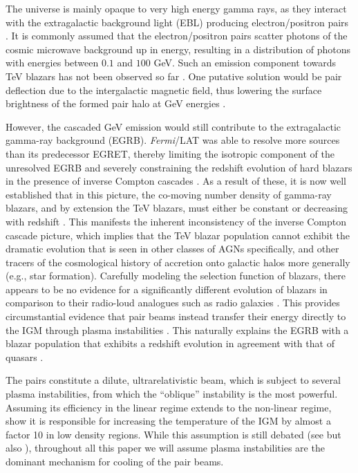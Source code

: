 \documentclass[numberedappendix]{emulateapj}
\begin{document}
The universe is mainly opaque to very high energy gamma rays, as they interact with the extragalactic background light (EBL) producing electron/positron pairs \citep{1967PhRv..155.1408G,1992ApJ...390L..49S}. It is commonly assumed that the electron/positron pairs scatter photons of the cosmic microwave background up in energy, resulting in a distribution of photons with energies between $0.1$ and $100$ GeV. Such an emission component towards TeV blazars has not been observed so far \citep{2010A&A...524A..77A,2014A&A...562A.145H}. One putative solution would be pair deflection due to the intergalactic magnetic field, thus lowering the surface brightness of the formed pair halo at GeV energies \citep{2013A&ARv..21...62D,2012ApJ...747L..14V,2011ApJ...733L..21D}. 

However, the cascaded GeV emission would still contribute to the extragalactic gamma-ray background (EGRB). \textit{Fermi}/LAT was able to resolve more sources than its predecessor EGRET, thereby limiting the isotropic component of the unresolved EGRB and severely constraining the redshift evolution of hard blazars in the presence of inverse Compton cascades \citep[e.g.,][]{Vent:10,Murase:2012,Inoue:2012}. As a result of these, it is now well established that in this picture, the co-moving number density of gamma-ray blazars, and by extension the TeV blazars, must either be constant or decreasing with redshift \citep{Knei-Mann:08,Vent:10,Abazajian:2011,Inoue:2012}. This manifests the inherent inconsistency of the inverse Compton cascade  picture, which implies that the TeV blazar population cannot exhibit the dramatic evolution that is seen in other classes of AGNs specifically, and other tracers of the cosmological history of accretion onto galactic halos more generally (e.g., star formation). Carefully modeling the selection function of blazars, there appears to be no evidence for a significantly different evolution of blazars in comparison to their radio-loud analogues such as radio galaxies \citep{Giommi:2012,Giommi:2013}. This provides circumstantial evidence that pair beams instead transfer their energy directly to the IGM through plasma instabilities \citep{2012ApJ...752...22B, 2012ApJ...758..102S, 2013ApJ...777...49S,2014arXiv1410.3797C}. This naturally explains the EGRB with a blazar population that exhibits a redshift evolution in agreement with that of quasars \citep{2014ApJ...790..137B,2013arXiv1308.0015B}.

The pairs constitute a dilute, ultrarelativistic beam, which is subject to several plasma instabilities, from which the ``oblique'' instability \citep{PhysRevE.70.046401} is the most powerful. Assuming its efficiency in the linear regime extends to the non-linear regime, \citet{2012ApJ...752...23C} show it is responsible for increasing the temperature of the IGM by almost a factor 10 in low density regions. While this assumption is still debated (see \citet{2013ApJ...770...54M,2014ApJ...787...49S} but also \citet{2013ApJ...777...49S,2012ApJ...758..102S,2014arXiv1410.3797C}), throughout all this paper we will assume plasma instabilities are the dominant mechanism for cooling of the pair beams.
\end{document}
